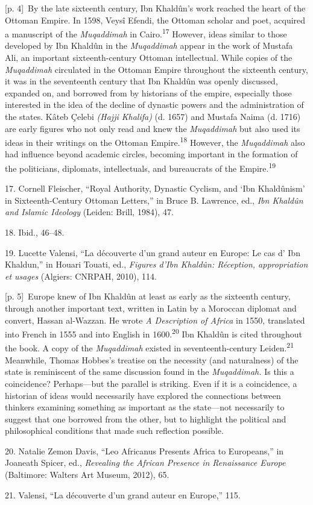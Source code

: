 \documentclass[10pt,a4paper]{article}
\begin{document}
{\scriptsize\color{gray} [p. 4]}\ By the late sixteenth century, Ibn Khaldûn’s work reached the heart of the Ottoman Empire. In 1598, Veysî Efendi, the Ottoman scholar and poet, acquired a manuscript of the \textit{Muqaddimah} in Cairo.\nobreak\textsuperscript{17} However, ideas similar to those developed by Ibn Khaldûn in the \textit{Muqaddimah} appear in the work of Mustafa Ali, an important sixteenth-century Ottoman intellectual. While copies of the \textit{Muqaddimah} circulated in the Ottoman Empire throughout the sixteenth century, it was in the seventeenth century that Ibn Khaldûn was openly discussed, expanded on, and borrowed from by historians of the empire, especially those interested in the idea of the decline of dynastic powers and the administration of the states. Kâteb Çelebi \textit{(Hajji Khalifa)} (d. 1657) and Mustafa Naima (d. 1716) are early figures who not only read and knew the \textit{Muqaddimah} but also used its ideas in their writings on the Ottoman Empire.\nobreak\textsuperscript{18} However, the \textit{Muqaddimah} also had influence beyond academic circles, becoming important in the formation of the politicians, diplomats, intellectuals, and bureaucrats of the Empire.\nobreak\textsuperscript{19}\par{\small 17. Cornell Fleischer, “Royal Authority, Dynastic Cyclism, and ‘Ibn Khaldûnism’ in Sixteenth-Century Ottoman Letters,” in Bruce B. Lawrence, ed., \textit{Ibn Khaldûn and Islamic Ideology} (Leiden: Brill, 1984), 47.\par}{\small 18. Ibid., 46–48.\par}{\small 19. Lucette Valensi, “La découverte d’un grand auteur en Europe: Le cas d’ Ibn Khaldun,” in Houari Touati, ed., \textit{Figures d’Ibn Khaldûn: Réception, appropriation et usages} (Algiers: CNRPAH, 2010), 114.\par}
{\scriptsize\color{gray} [p. 5]}\ Europe knew of Ibn Khaldûn at least as early as the sixteenth century, through another important text, written in Latin by a Moroccan diplomat and convert, Hassan al-Wazzan. He wrote \textit{A Description of Africa} in 1550, translated into French in 1555 and into English in 1600.\nobreak\textsuperscript{20} Ibn Khaldûn is cited throughout the book. A copy of the \textit{Muqaddimah} existed in seventeenth-century Leiden.\nobreak\textsuperscript{21} Meanwhile, Thomas Hobbes’s treatise on the necessity (and naturalness) of the state is reminiscent of the same discussion found in the \textit{Muqaddimah.} Is this a coincidence? Perhaps—but the parallel is striking. Even if it is a coincidence, a historian of ideas would necessarily have explored the connections between thinkers examining something as important as the state—not necessarily to suggest that one borrowed from the other, but to highlight the political and philosophical conditions that made such reflection possible.\par{\small 20. Natalie Zemon Davis, “Leo Africanus Presents Africa to Europeans,” in Joaneath Spicer, ed., \textit{Revealing the African Presence in Renaissance Europe} (Baltimore: Walters Art Museum, 2012), 65.\par}{\small 21. Valensi, “La découverte d’un grand auteur en Europe,” 115.\par}
\end{document}
